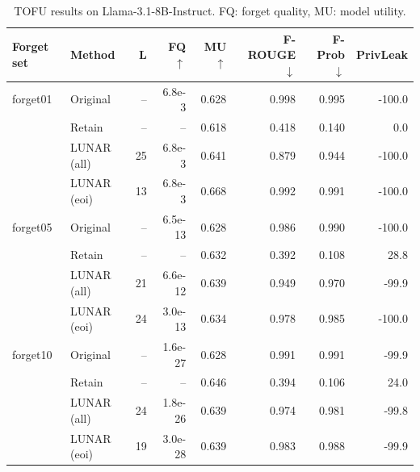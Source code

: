 \begin{table}[t]
\centering\small
\caption{TOFU results on Llama-3.1-8B-Instruct. FQ: forget quality, MU: model utility.}
\begin{tabular}{llrrrrrr}
\toprule
Forget set & Method & L & FQ$\uparrow$ & MU$\uparrow$ & F-ROUGE$\downarrow$ & F-Prob$\downarrow$ & PrivLeak \\
\midrule
forget01 & Original & -- & 6.8e-3 & 0.628 & 0.998 & 0.995 & -100.0 \\
 & Retain & -- & -- & 0.618 & 0.418 & 0.140 & 0.0 \\
 & LUNAR (all) & 25 & 6.8e-3 & 0.641 & 0.879 & 0.944 & -100.0 \\
 & LUNAR (eoi) & 13 & 6.8e-3 & 0.668 & 0.992 & 0.991 & -100.0 \\
\midrule
forget05 & Original & -- & 6.5e-13 & 0.628 & 0.986 & 0.990 & -100.0 \\
 & Retain & -- & -- & 0.632 & 0.392 & 0.108 & 28.8 \\
 & LUNAR (all) & 21 & 6.6e-12 & 0.639 & 0.949 & 0.970 & -99.9 \\
 & LUNAR (eoi) & 24 & 3.0e-13 & 0.634 & 0.978 & 0.985 & -100.0 \\
\midrule
forget10 & Original & -- & 1.6e-27 & 0.628 & 0.991 & 0.991 & -99.9 \\
 & Retain & -- & -- & 0.646 & 0.394 & 0.106 & 24.0 \\
 & LUNAR (all) & 24 & 1.8e-26 & 0.639 & 0.974 & 0.981 & -99.8 \\
 & LUNAR (eoi) & 19 & 3.0e-28 & 0.639 & 0.983 & 0.988 & -99.9 \\
\bottomrule
\end{tabular}
\label{tab:tofu-Llama-3.1-8B-Instruct}
\end{table}
